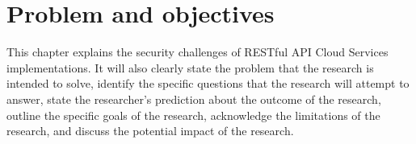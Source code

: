 \chapter{Problem and objectives}

This chapter explains the security challenges of RESTful API Cloud Services implementations. It will also clearly state the problem that the research is intended to solve, identify the specific questions that the research will attempt to answer, state the researcher’s prediction about the outcome of the research, outline the specific goals of the research, acknowledge the limitations of the research, and discuss the potential impact of the research.
